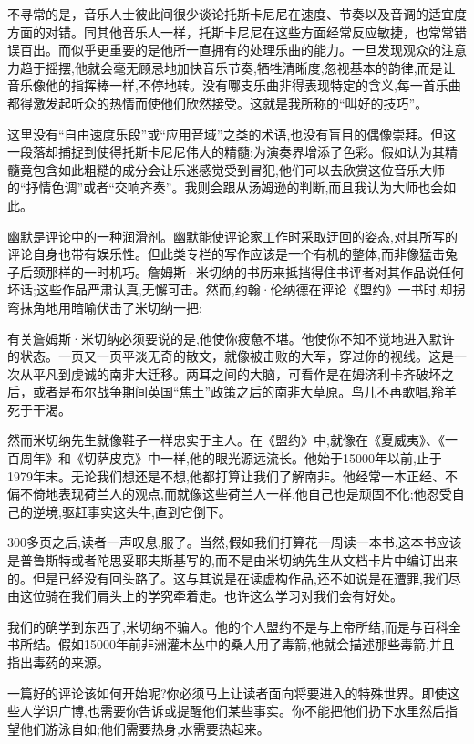 不寻常的是，音乐人士彼此间很少谈论托斯卡尼尼在速度、节奏以及音调的适宜度方面的对错。同其他音乐人一样，托斯卡尼尼在这些方面经常反应敏捷，也常常错误百出。而似乎更重要的是他所一直拥有的处理乐曲的能力。一旦发现观众的注意力趋于摇摆,他就会毫无顾忌地加快音乐节奏,牺牲清晰度,忽视基本的韵律,而是让音乐像他的指挥棒一样,不停地转。没有哪支乐曲非得表现特定的含义,每一首乐曲都得激发起听众的热情而使他们欣然接受。这就是我所称的“叫好的技巧”。

这里没有“自由速度乐段”或“应用音域”之类的术语,也没有盲目的偶像崇拜。但这一段落却捕捉到使得托斯卡尼尼伟大的精髓:为演奏界增添了色彩。假如认为其精髓竟包含如此粗糙的成分会让乐迷感觉受到冒犯,他们可以去欣赏这位音乐大师的“抒情色调”或者“交响齐奏”。我则会跟从汤姆逊的判断,而且我认为大师也会如此。

幽默是评论中的一种润滑剂。幽默能使评论家工作时采取迂回的姿态,对其所写的评论自身也带有娱乐性。但此类专栏的写作应该是一个有机的整体,而非像猛击兔子后颈那样的一时机巧。詹姆斯·米切纳的书历来抵挡得住书评者对其作品说任何坏话;这些作品严肃认真,无懈可击。然而,约翰·伦纳德在评论《盟约》一书时,却拐弯抹角地用暗喻伏击了米切纳一把:

有关詹姆斯·米切纳必须要说的是,他使你疲惫不堪。他使你不知不觉地进入默许的状态。一页又一页平淡无奇的散文，就像被击败的大军，穿过你的视线。这是一次从平凡到虔诚的南非大迁移。两耳之间的大脑，可看作是在姆济利卡齐破坏之后，或者是布尔战争期间英国“焦土”政策之后的南非大草原。鸟儿不再歌唱,羚羊死于干渴。

然而米切纳先生就像鞋子一样忠实于主人。在《盟约》中,就像在《夏威夷》、《一百周年》和《切萨皮克》中一样,他的眼光源远流长。他始于15000年以前,止于1979年末。无论我们想还是不想,他都打算让我们了解南非。他经常一本正经、不偏不倚地表现荷兰人的观点,而就像这些荷兰人一样,他自己也是顽固不化;他忍受自己的逆境,驱赶事实这头牛,直到它倒下。

300多页之后,读者一声叹息,服了。当然,假如我们打算花一周读一本书,这本书应该是普鲁斯特或者陀思妥耶夫斯基写的,而不是由米切纳先生从文档卡片中编订出来的。但是已经没有回头路了。这与其说是在读虚构作品,还不如说是在遭罪,我们尽由这位骑在我们肩头上的学究牵着走。也许这么学习对我们会有好处。

我们的确学到东西了,米切纳不骗人。他的个人盟约不是与上帝所结,而是与百科全书所结。假如15000年前非洲灌木丛中的桑人用了毒箭,他就会描述那些毒箭,并且指出毒药的来源。

一篇好的评论该如何开始呢?你必须马上让读者面向将要进入的特殊世界。即使这些人学识广博,也需要你告诉或提醒他们某些事实。你不能把他们扔下水里然后指望他们游泳自如;他们需要热身,水需要热起来。

